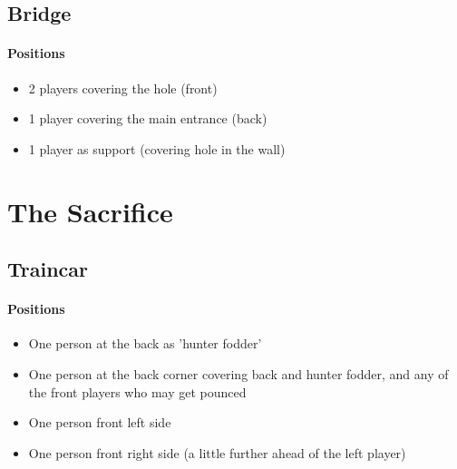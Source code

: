 \subsection{Bridge}
\paragraph{Positions}
\begin{itemize}
\item 2 players covering the hole (front)
\item 1 player covering the main entrance (back)
\item 1 player as support (covering hole in the wall)
\end{itemize}

\section{The Sacrifice}

\subsection{Traincar}
\paragraph{Positions}
\begin{itemize}
\item One person at the back as 'hunter fodder'
\item One person at the back corner covering back and hunter fodder, and any of the front players who may get pounced
\item One person front left side
\item One person front right side (a little further ahead of the left player)
\end{itemize}

